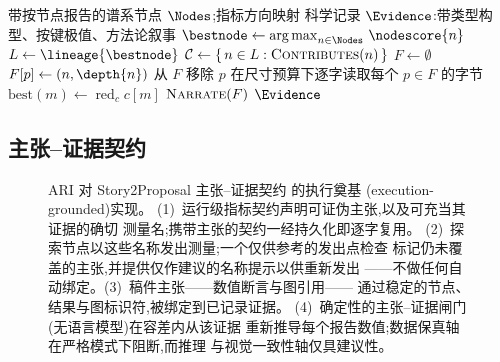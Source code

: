 \begin{algorithm}[t]
\small
\caption{证据组装(探索 $\to$ 撰写器输入)。}
\label{alg:evidence-assembly}
\begin{algorithmic}[1]
\Require 带按节点报告的谱系节点 $\Nodes$;指标方向映射
\Ensure  科学记录 $\Evidence$:带类型构型、按键极值、方法论叙事
\State $\bestnode \gets \operatorname*{arg\,max}_{n \in \Nodes}\, \nodescore{n}$
\State $L \gets \lineage{\bestnode}$ 
\State $\mathcal{C} \gets \{\, n \in L : \textsc{Contributes}(n) \,\}$
\State $F \gets \emptyset$ 
      \State $F[p] \gets (n, \depth{n})$ 
    \EndIf
  \EndFor
    \State 从 $F$ 移除 $p$ 
  \EndFor
\EndFor
\State 在尺寸预算下逐字读取每个 $p \in F$ 的字节
  \State $\mathrm{best}(m) \gets \operatorname*{red}_{c} c[m]$
\EndFor
\State $\textsc{Narrate}(F)$
\State \Return $\Evidence$
\end{algorithmic}
\end{algorithm}

\subsection{主张--证据契约}\label{sec:paper:contract}

\begin{figure}[t]
  \centering
  \resizebox{\columnwidth}{!}{}
  \caption{ARI 对 Story2Proposal 主张--证据契约
           \cite{qian2026story2proposal} 的执行奠基
           (execution-grounded)实现。
           (1)~运行级指标契约声明可证伪主张,以及可充当其证据的确切
           测量名;携带主张的契约一经持久化即逐字复用。
           (2)~探索节点以这些名称发出测量;一个仅供参考的发出点检查
           标记仍未覆盖的主张,并提供仅作建议的名称提示以供重新发出
           ——不做任何自动绑定。(3)~稿件主张——数值断言与图引用——
           通过稳定的节点、结果与图标识符,被绑定到已记录证据。
           (4)~确定性的主张--证据闸门(无语言模型)在容差内从该证据
           重新推导每个报告数值;数据保真轴在严格模式下阻断,而推理
           与视觉一致性轴仅具建议性。}
  \label{fig:claim-evidence}
\end{figure}

